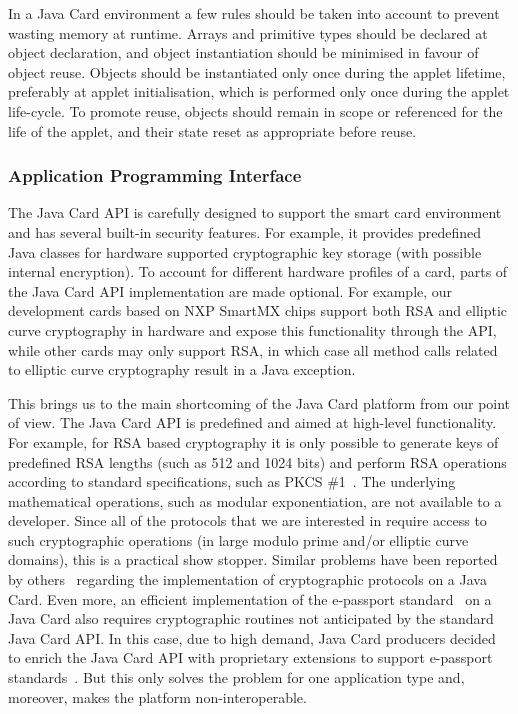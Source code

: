 In a Java Card environment a few rules should be taken into account to prevent
wasting memory at runtime. Arrays and primitive types should be declared at
object declaration, and object instantiation should be minimised in favour of
object reuse. Objects should be instantiated only once during the applet
lifetime, preferably at applet initialisation, which is performed only once
during the applet life-cycle. To promote reuse, objects should remain in scope
or referenced for the life of the applet, and their state reset as appropriate
before reuse.

\subsubsection{Application Programming Interface}

The Java Card API is carefully designed to support the smart card environment
and has several built-in security features. For example, it provides predefined
Java classes for hardware supported cryptographic key storage (with possible
internal encryption). To account for different hardware profiles of a card,
parts of the Java Card API implementation are made optional. For example, our
development cards based on NXP SmartMX chips support both RSA and elliptic curve
cryptography in hardware and expose this functionality through the API, while
other cards may only support RSA, in which case all method calls related to
elliptic curve cryptography result in a Java exception.

This brings us to the main shortcoming of the Java Card platform from our point
of view. The Java Card API is predefined and aimed at high-level functionality.
For example, for RSA based cryptography it is only possible to generate keys of
predefined RSA lengths (such as 512 and 1024 bits) and perform RSA operations
according to standard specifications, such as PKCS \#1~\cite{PKCS_1}. The
underlying mathematical operations, such as modular exponentiation, are not
available to a developer. Since all of the protocols that we are interested in
require access to such cryptographic operations (in large modulo prime and/or
elliptic curve domains), this is a practical show stopper. Similar problems have
been reported by others~\cite{Sterckx09} regarding the implementation of
cryptographic protocols on a Java Card. Even more, an efficient implementation
of the e-passport standard~\cite{EAC20} on a Java Card also requires
cryptographic routines not anticipated by the standard Java Card API. In this
case, due to high demand, Java Card producers decided to enrich the Java Card
API with proprietary extensions to support e-passport standards~\cite{NXP09}.
But this only solves the problem for one application type and, moreover, makes
the platform non-interoperable.

